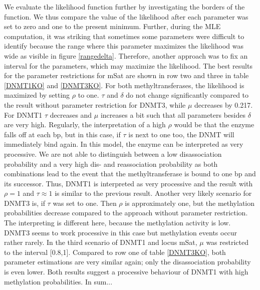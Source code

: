 We evaluate the likelihood function further by investigating the borders of the function. We thus compare the value of the likelihood after each parameter was set to zero and one to the present minimum. Further, during the \ac{MLE} computation, it was striking that sometimes some parameters were difficult to identify because the range where this parameter maximizes the likelihood was wide as visible in figure \ref{rangedelta}. Therefore, another approach was to fix an interval for the parameters, which may maximize the likelihood. The best results for the parameter restrictions for mSat are shown in row two and three in table \ref{DNMT1KO} and \ref{DNMT3KO}.\newline
For both methyltransferases, the likelihood is maximized by setting $\rho$ to one. $\tau$ and $\delta$ do not change significantly compared to the result without parameter restriction for DNMT3, while $\mu$ decreases by 0.217.\newline
For DNMT1 $\tau$ decreases and $\mu$ increases a bit such that all parameters besides $\delta$ are very high. Regularly, the interpretation of a high $\rho$ would be that the enzyme falls off at each \ac{bp}, but in this case, if $\tau$ is next to one too, the \ac{DNMT} will immediately bind again. In this model, the enzyme can be interpreted as very processive. We are not able to distinguish between a low disassociation probability and a very high dis- and reassociation probability as both combinations lead to the event that the methyltransferase is bound to one \ac{bp} and its successor. Thus, DNMT1 is interpreted as very processive and the result with $\rho=1$ and $\tau \approx 1$ is similar to the previous result.\newline
Another very likely scenario for DNMT3 is, if $\tau$ was set to one. Then $\rho$ is approximately one, but the methylation probabilities decrease compared to the approach without parameter restriction. The interpreting is different here, because the methylation activity is low. DNMT3 seems to work processive in this case but methylation events occur rather rarely.\newline
In the third scenario of DNMT1 and locus mSat, $\mu$ was restricted to the interval [0.8,1]. Compared to row one of table \ref{DNMT3KO}, both parameter estimations are very similar again; only the disassociation probability is even lower. Both results suggest a processive behaviour of DNMT1 with high methylation probabilities.\newline
In sum...

